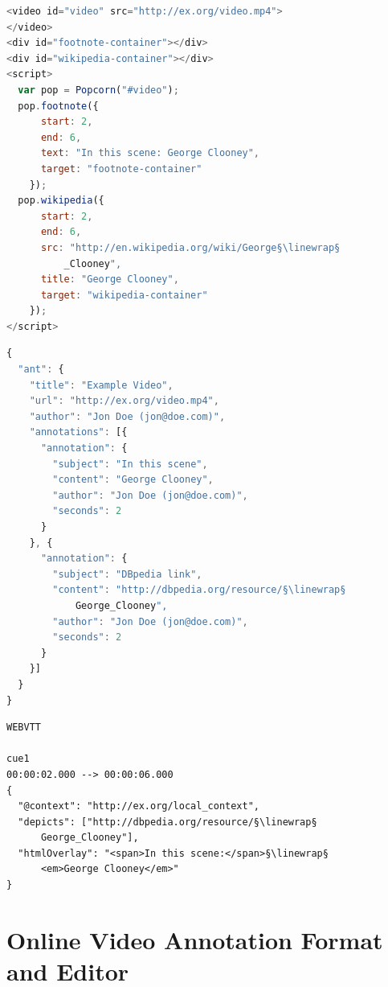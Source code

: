 \documentclass[runningheads,a4paper]{llncs}
\newcommand{\linewrap}{\raisebox{-.6ex}{\textcolor{grey}{$\hookleftarrow$}}}
\begin{document}
\begin{lstlisting}[caption={Popcorn.js example},
  label=listing:popcorn, float=t!, language=JavaScript]
<video id="video" src="http://ex.org/video.mp4">
</video>
<div id="footnote-container"></div>
<div id="wikipedia-container"></div>
<script>
  var pop = Popcorn("#video");
  pop.footnote({
      start: 2,
      end: 6,
      text: "In this scene: George Clooney",
      target: "footnote-container"
    });
  pop.wikipedia({
      start: 2,
      end: 6,
      src: "http://en.wikipedia.org/wiki/George§\linewrap§
          _Clooney",
      title: "George Clooney",
      target: "wikipedia-container"
    });    
</script>
\end{lstlisting}

\begin{lstlisting}[caption={VideoANT annotations analog to \autoref{listing:popcorn}},
  label=listing:videoant, language=JavaScript, float=t!]
{
  "ant": {
    "title": "Example Video",
    "url": "http://ex.org/video.mp4",
    "author": "Jon Doe (jon@doe.com)",
    "annotations": [{
      "annotation": {
        "subject": "In this scene",
        "content": "George Clooney",
        "author": "Jon Doe (jon@doe.com)",
        "seconds": 2
      }
    }, {
      "annotation": {
        "subject": "DBpedia link",
        "content": "http://dbpedia.org/resource/§\linewrap§
            George_Clooney",
        "author": "Jon Doe (jon@doe.com)",
        "seconds": 2
      }
    }]
  }
}
\end{lstlisting}

\begin{lstlisting}[caption={WebVTT annotations analog to \autoref{listing:popcorn}},
  label=listing:webvttclooney, float=t!]
WEBVTT

cue1
00:00:02.000 --> 00:00:06.000
{
  "@context": "http://ex.org/local_context",
  "depicts": ["http://dbpedia.org/resource/§\linewrap§
      George_Clooney"],
  "htmlOverlay": "<span>In this scene:</span>§\linewrap§
      <em>George Clooney</em>"
}
\end{lstlisting}

\section{Online Video Annotation Format and Editor}
\label{sec:online-video-annotation-format-and-editor}
\end{document}
